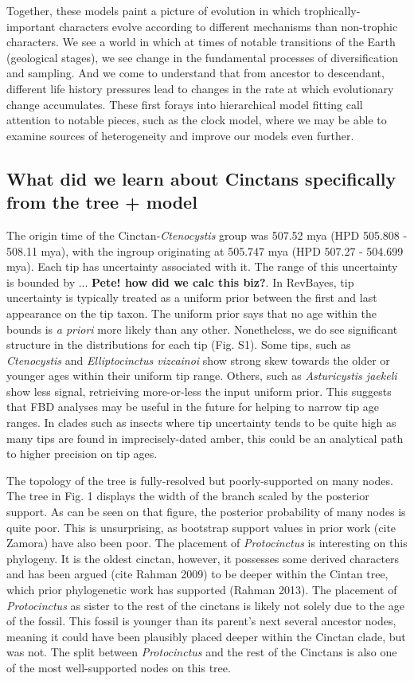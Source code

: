\documentclass{article}
\begin{document}
Together, these models paint a picture of evolution in which trophically-important characters evolve according to different mechanisms than non-trophic characters.
We see a world in which at times of notable transitions of the Earth (geological stages), we see change in the fundamental processes of diversification and sampling.
And we come to understand that from ancestor to descendant, different life history pressures lead to changes in the rate at which evolutionary change accumulates. 
These first forays into hierarchical model fitting call attention to notable pieces, such as the clock model, where we may be able to examine sources of heterogeneity and improve our models even further.

\subsection{What did we learn about Cinctans specifically from the tree + model}

The origin time of the Cinctan-\textit{Ctenocystis} group was 507.52 mya (HPD 505.808 - 508.11 mya), with the ingroup originating at 505.747 mya (HPD 507.27 - 504.699 mya).
Each tip has uncertainty associated with it.
The range of this uncertainty is bounded by ... \textbf{Pete! how did we calc this biz?}.
In RevBayes, tip uncertainty is typically treated as a uniform prior between the first and last appearance on the tip taxon.
The uniform prior says that no age within the bounds is \textit{a priori} more likely than any other.
Nonetheless, we do see significant structure in the distributions for each tip (Fig. S1). 
Some tips, such as \textit{Ctenocystis} and \textit{Elliptocinctus vizcainoi} show strong skew towards the older or younger ages within their uniform tip range.
Others, such as \textit{Asturicystis jaekeli} show less signal, retrieiving more-or-less the input uniform prior.
This suggests that FBD analyses may be useful in the future for helping to narrow tip age ranges.
In clades such as insects where tip uncertainty tends to be quite high as many tips are found in imprecisely-dated amber, this could be an analytical path to higher precision on tip ages.

The topology of the tree is fully-resolved but poorly-supported on many nodes.
The tree in Fig. 1 displays the width of the branch scaled by the posterior support.
As can be seen on that figure, the posterior probability of many nodes is quite poor. 
This is unsurprising, as bootstrap support values in prior work (cite Zamora) have also been poor.
The placement of \textit{Protocinctus} is interesting on this phylogeny. 
It is the oldest cinctan, however, it possesses some derived characters and has been argued (cite Rahman 2009) to be deeper within the Cintan tree, which prior phylogenetic work has supported (Rahman 2013). 
The placement of \textit{Protocinctus} as sister to the rest of the cinctans is likely not solely due to the age of the fossil. This fossil is younger than its parent's next several ancestor nodes, meaning it could have been plausibly placed deeper within the Cinctan clade, but was not. 
The split between \textit{Protocinctus} and the rest of the Cinctans is also one of the most well-supported nodes on this tree.
\end{document}
